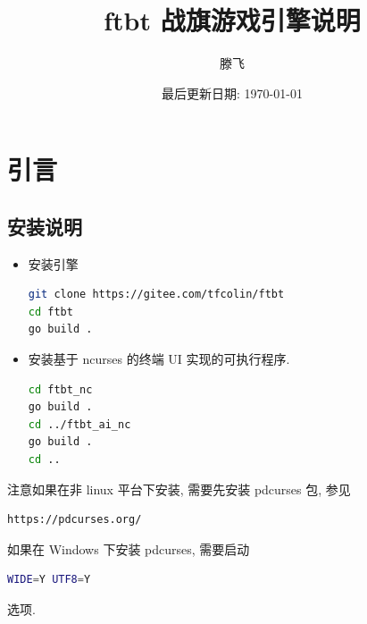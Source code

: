 \documentclass[UTF8, zihao=-4]{ctexart} %
\title{ftbt 战旗游戏引擎说明}
\date{最后更新日期: \today}
\author{滕飞}
\begin{document}
\maketitle

\section{引言}
\subsection{安装说明}
\begin{itemize}
      \item 安装引擎
            \begin{lstlisting}[language=bash]
git clone https://gitee.com/tfcolin/ftbt
cd ftbt
go build .
            \end{lstlisting}

\item 安装基于 ncurses 的终端 UI 实现的可执行程序.
            \begin{lstlisting}[language=bash]
cd ftbt_nc
go build .
cd ../ftbt_ai_nc
go build .
cd ..
            \end{lstlisting}
\end{itemize}
注意如果在非 linux 平台下安装, 需要先安装 pdcurses 包, 参见 
\begin{verbatim}
https://pdcurses.org/
\end{verbatim}
如果在 Windows 下安装 pdcurses, 需要启动 
\begin{lstlisting}[language=bash]
WIDE=Y UTF8=Y
\end{lstlisting}
选项.
\end{document}
